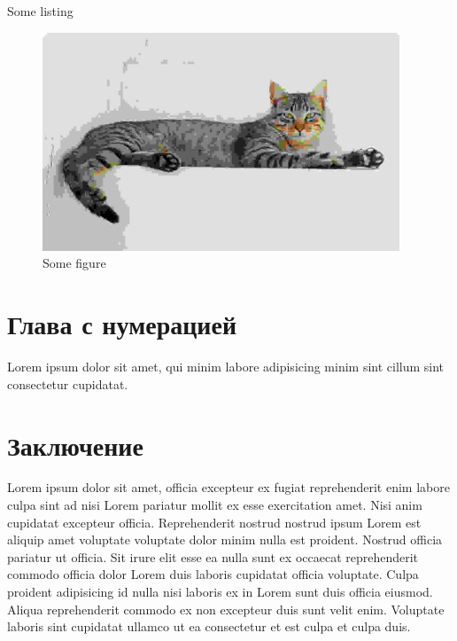 \documentclass[14pt,a4paper]{extarticle}
\newcommand{\asection}[1]{
  \section*{#1}
  \addcontentsline{toc}{section}{#1}
}
\newenvironment{code}{\captionsetup{type=listing}}{}
\begin{document}
\begin{code}
	\inputminted[fontsize=\footnotesize]{python}{listings/matrix.py}
	\caption{Some listing}
	\label{lst:test}
\end{code}

\begin{figure}[H]
	\begin{center}
		\includegraphics[width=0.95\textwidth]{figures/cat.jpg}
	\end{center}
	\caption{Some figure}
	\label{fig:cat}
\end{figure}

\section{Глава с нумерацией}

Lorem ipsum dolor sit amet, qui minim labore adipisicing minim sint cillum sint
consectetur cupidatat.

\asection{Заключение}

Lorem ipsum dolor sit amet, officia excepteur ex fugiat reprehenderit enim
labore culpa sint ad nisi Lorem pariatur mollit ex esse exercitation amet. Nisi
anim cupidatat excepteur officia. Reprehenderit nostrud nostrud ipsum Lorem est
aliquip amet voluptate voluptate dolor minim nulla est proident. Nostrud
officia pariatur ut officia. Sit irure elit esse ea nulla sunt ex occaecat
reprehenderit commodo officia dolor Lorem duis laboris cupidatat officia
voluptate. Culpa proident adipisicing id nulla nisi laboris ex in Lorem sunt
duis officia eiusmod. Aliqua reprehenderit commodo ex non excepteur duis sunt
velit enim. Voluptate laboris sint cupidatat ullamco ut ea consectetur et est
culpa et culpa duis.

\newpage
\printbibliography[title={Список используемой литературы}]
\end{document}
